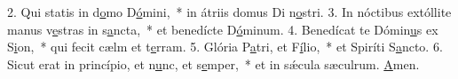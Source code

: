 2. Qui statis in d\uline{o}mo D\uline{ó}mini,~* in átriis domus Di n\uline{o}stri.
3. In nóctibus extóllite manus v\uline{e}stras in s\uline{a}ncta,~* et benedícte D\uline{ó}minum.
4. Benedícat te Dómin\uline{u}s ex S\uline{i}on,~* qui fecit cælm et t\uline{e}rram.
5. Glória P\uline{a}tri, et F\uline{í}lio,~* et Spiríti S\uline{a}ncto.
6. Sicut erat in princípio, et n\uline{u}nc, et s\uline{e}mper,~* et in sǽcula sæculrum. \uline{A}men.
